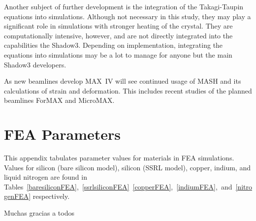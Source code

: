\documentclass{iucr}
\begin{document}
Another subject of further development is the integration of the Takagi-Taupin equations into simulations. Although not necessary in this study, they may play a significant role in simulations with stronger heating of the crystal. They are computationally intensive, however, and are not directly integrated into the capabilities the Shadow3. Depending on implementation, integrating the equations into simulations may be a lot to manage for anyone but the main Shadow3 developers.

As new beamlines develop MAX~IV will see continued usage of MASH and its calculations of strain and deformation. This includes recent studies of the planned beamlines ForMAX and MicroMAX.



\appendix

\section{FEA Parameters}\label{feaparameters}

This appendix tabulates parameter values for materials in FEA simulations. Values for silicon (bare silicon model), silicon (SSRL model), copper, indium, and liquid nitrogen are found in Tables~\ref{baresiliconFEA},~\ref{ssrlsiliconFEA}~\ref{copperFEA},~\ref{indiumFEA},~and~\ref{nitrogenFEA} respectively.
\vspace{1.5cm}







Muchas gracias a todos


\end{document}
